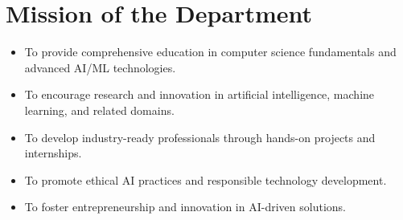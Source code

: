 \section*{Mission of the Department}
\begin{itemize}
    \item To provide comprehensive education in computer science fundamentals and advanced AI/ML technologies.
    \item To encourage research and innovation in artificial intelligence, machine learning, and related domains.
    \item To develop industry-ready professionals through hands-on projects and internships.
    \item To promote ethical AI practices and responsible technology development.
    \item To foster entrepreneurship and innovation in AI-driven solutions.
\end{itemize}

\newpage
